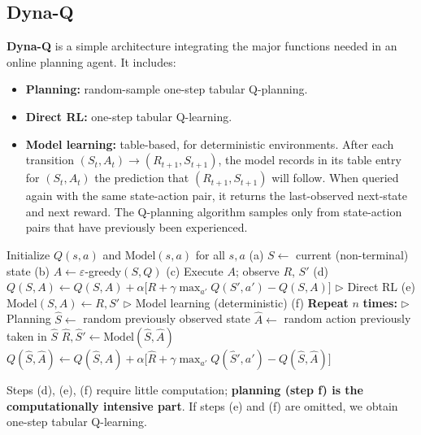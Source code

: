 \documentclass[11pt,a4paper]{article}
\theoremstyle{definition}
\theoremstyle{plain}
\theoremstyle{remark}
\begin{document}
\subsection{Dyna-Q}

\textbf{Dyna-Q} is a simple architecture integrating the major functions needed in an online planning agent. It includes:
\begin{itemize}
    \item \textbf{Planning:} random-sample one-step tabular Q-planning.
    \item \textbf{Direct RL:} one-step tabular Q-learning.
    \item \textbf{Model learning:} table-based, for deterministic environments. After each transition $(S_t, A_t) \to (R_{t+1}, S_{t+1})$, the model records in its table entry for $(S_t, A_t)$ the prediction that $(R_{t+1}, S_{t+1})$ will follow. When queried again with the same state-action pair, it returns the last-observed next-state and next reward. The Q-planning algorithm samples only from state-action pairs that have previously been experienced.
\end{itemize}

\begin{algorithm}
\caption{Tabular Dyna-Q}
\begin{algorithmic}
\STATE Initialize $Q(s, a)$ and $\text{Model}(s, a)$ for all $s, a$
\LOOP
    \STATE (a) $S \leftarrow$ current (non-terminal) state
    \STATE (b) $A \leftarrow \varepsilon$-greedy$(S, Q)$
    \STATE (c) Execute $A$; observe $R$, $S'$
    \STATE (d) $Q(S, A) \leftarrow Q(S, A) + \alpha\bigl[R + \gamma \max_{a'} Q(S', a') - Q(S, A)\bigr]$ \hfill $\triangleright$ Direct RL
    \STATE (e) $\text{Model}(S, A) \leftarrow R, S'$ \hfill $\triangleright$ Model learning (deterministic)
    \STATE (f) \textbf{Repeat} $n$ \textbf{times:} \hfill $\triangleright$ Planning
    \STATE \quad $\hat{S} \leftarrow$ random previously observed state
    \STATE \quad $\hat{A} \leftarrow$ random action previously taken in $\hat{S}$
    \STATE \quad $\hat{R}, \hat{S}' \leftarrow \text{Model}(\hat{S}, \hat{A})$
    \STATE \quad $Q(\hat{S}, \hat{A}) \leftarrow Q(\hat{S}, \hat{A}) + \alpha\bigl[\hat{R} + \gamma \max_{a'} Q(\hat{S}', a') - Q(\hat{S}, \hat{A})\bigr]$
\ENDLOOP
\end{algorithmic}
\end{algorithm}

Steps (d), (e), (f) require little computation; \textbf{planning (step f) is the computationally intensive part}. If steps (e) and (f) are omitted, we obtain one-step tabular Q-learning.
\end{document}
